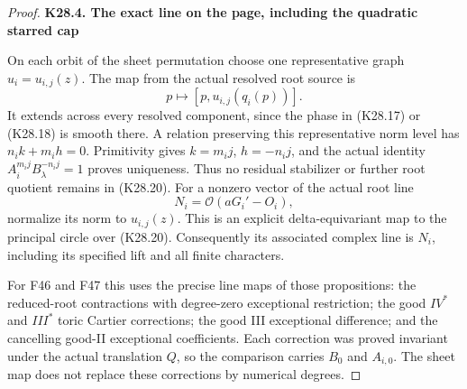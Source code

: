 \begin{proof}
\par

\medskip\noindent\textbf{K28.4. The exact line on the page, including the quadratic starred cap}

\par\nobreak

On each orbit of the sheet permutation choose one representative graph
\(u_i=u_{i,j}(z)\). The map from the actual resolved root source is
\[
                        p\longmapsto [p,u_{i,j}(q_i(p))].
 \tag{K28.20}
\]
It extends across every resolved component, since the phase in
(K28.17) or (K28.18) is smooth there. A relation preserving this
representative norm level has \(n_i k+m_i h=0\). Primitivity gives
\(k=m_i j\), \(h=-n_i j\), and the actual identity
\(A_i^{m_i j}B_\lambda^{-n_i j}=1\) proves uniqueness. Thus no residual
stabilizer or further root quotient remains in (K28.20).
For a nonzero vector of the actual root line
\[
                         N_i=\mathcal O(aG_i'-O_i),
\]
normalize its norm to \(u_{i,j}(z)\). This is an explicit
delta-equivariant map to the principal circle over (K28.20).
Consequently its associated complex line is \(N_i\), including its
specified lift and all finite characters.

For F46 and F47 this uses the precise line maps of those propositions:
the reduced-root contractions with degree-zero exceptional restriction;
the good \(IV^*\) and \(III^*\) toric Cartier corrections; the good
III exceptional difference; and the cancelling good-II exceptional
coefficients. Each correction was proved invariant under the actual
translation \(Q\), so the comparison carries \(B_0\) and \(A_{i,0}\).
The sheet map does not replace these corrections by numerical degrees.


\end{proof}
